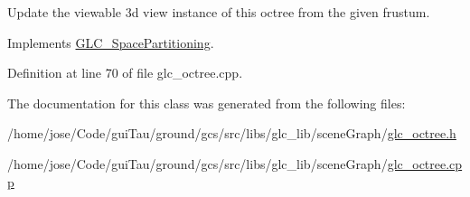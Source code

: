 Update the viewable 3d view instance of this octree from the given frustum. 



Implements \hyperlink{class_g_l_c___space_partitioning_aca395c76ba881cd9c96310b59dc1b51a}{G\-L\-C\-\_\-\-Space\-Partitioning}.



Definition at line 70 of file glc\-\_\-octree.\-cpp.



The documentation for this class was generated from the following files\-:\begin{DoxyCompactItemize}
\item 
/home/jose/\-Code/gui\-Tau/ground/gcs/src/libs/glc\-\_\-lib/scene\-Graph/\hyperlink{glc__octree_8h}{glc\-\_\-octree.\-h}\item 
/home/jose/\-Code/gui\-Tau/ground/gcs/src/libs/glc\-\_\-lib/scene\-Graph/\hyperlink{glc__octree_8cpp}{glc\-\_\-octree.\-cpp}\end{DoxyCompactItemize}
